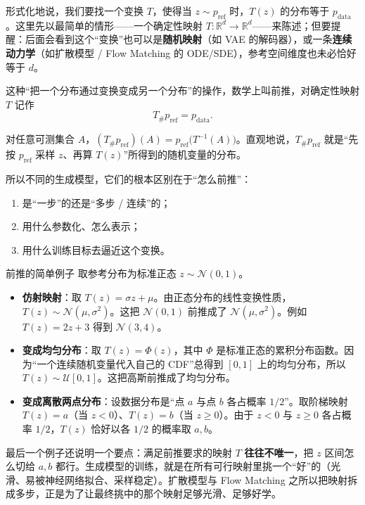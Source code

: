 形式化地说，我们要找一个变换 $T$，使得当 $z \sim p_{\text{ref}}$ 时，$T(z)$ 的分布等于 $p_{\text{data}}$。这里先以最简单的情形——一个确定性映射 $T: \mathbb{R}^d \to \mathbb{R}^d$——来陈述；但要提醒：后面会看到这个“变换”也可以是\textbf{随机映射}（如 VAE 的解码器），或一条\textbf{连续动力学}（如扩散模型 / Flow Matching 的 ODE/SDE），参考空间维度也未必恰好等于 $d$。

这种“把一个分布通过变换变成另一个分布”的操作，数学上叫前推，对确定性映射 $T$ 记作
\begin{equation}
T_\# p_{\text{ref}} = p_{\text{data}}.
\end{equation}

对任意可测集合 $A$，$(T_\# p_{\text{ref}})(A) = p_{\text{ref}}\big(T^{-1}(A)\big)$。直观地说，$T_\# p_{\text{ref}}$ 就是“先按 $p_{\text{ref}}$ 采样 $z$、再算 $T(z)$”所得到的随机变量的分布。

所以不同的生成模型，它们的根本区别在于“怎么前推”：
\begin{enumerate}
\item 是“一步”的还是“多步 / 连续”的；
\item 用什么参数化、怎么表示；
\item 用什么训练目标去逼近这个变换。
\end{enumerate}

\begin{example}{前推的简单例子}{}
取参考分布为标准正态 $z\sim\mathcal N(0,1)$。
\begin{itemize}
\item \textbf{仿射映射}：取 $T(z) = \sigma z + \mu$。由正态分布的线性变换性质，$T(z)\sim\mathcal N(\mu,\sigma^2)$。这把 $\mathcal N(0,1)$ 前推成了 $\mathcal N(\mu,\sigma^2)$。例如 $T(z)=2z+3$ 得到 $\mathcal N(3,4)$。
\item \textbf{变成均匀分布}：取 $T(z)=\Phi(z)$，其中 $\Phi$ 是标准正态的累积分布函数。因为“一个连续随机变量代入自己的 CDF”总得到 $[0,1]$ 上的均匀分布，所以 $T(z)\sim\mathcal U[0,1]$。这把高斯前推成了均匀分布。
\item \textbf{变成离散两点分布}：设数据分布是“点 $a$ 与点 $b$ 各占概率 $1/2$”。取阶梯映射 $T(z)=a$（当 $z<0$）、$T(z)=b$（当 $z\ge0$）。由于 $z<0$ 与 $z\ge0$ 各占概率 $1/2$，$T(z)$ 恰好以各 $1/2$ 的概率取 $a,b$。
\end{itemize}

最后一个例子还说明一个要点：满足前推要求的映射 $T$ \textbf{往往不唯一}，把 $z$ 区间怎么切给 $a,b$ 都行。生成模型的训练，就是在所有可行映射里挑一个“好”的（光滑、易被神经网络拟合、采样稳定）。扩散模型与 Flow Matching 之所以把映射拆成多步，正是为了让最终挑中的那个映射足够光滑、足够好学。

\end{example}

